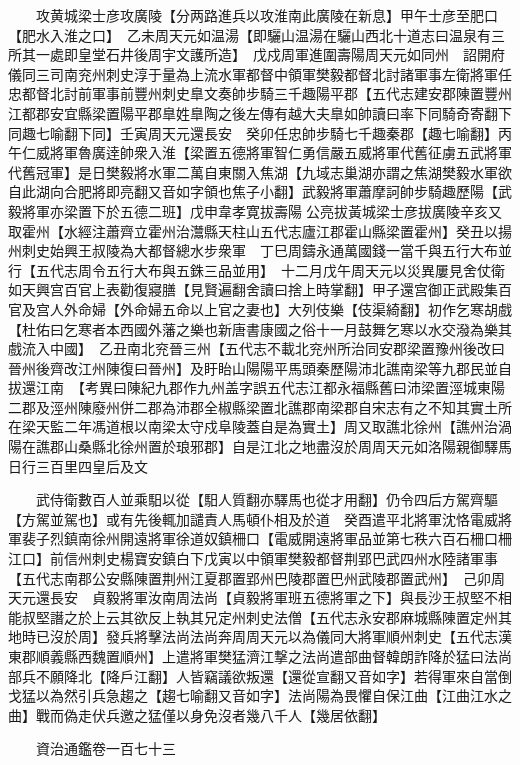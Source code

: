 　　攻黄城梁士彦攻廣陵【分两路進兵以攻淮南此廣陵在新息】甲午士彦至肥口【肥水入淮之口】　乙未周天元如温湯【即驪山温湯在驪山西北十道志曰温泉有三所其一處即皇堂石井後周宇文護所造】　戊戍周軍進圍壽陽周天元如同州　詔開府儀同三司南兖州刺史淳于量為上流水軍都督中領軍樊毅都督北討諸軍事左衛將軍任忠都督北討前軍事前豐州刺史臯文奏帥步騎三千趣陽平郡【五代志建安郡陳置豐州江都郡安宜縣梁置陽平郡臯姓臯陶之後左傳有越大夫臯如帥讀曰率下同騎奇寄翻下同趣七喻翻下同】壬寅周天元還長安　癸卯任忠帥步騎七千趣秦郡【趣七喻翻】丙午仁威將軍魯廣逹帥衆入淮【梁置五德將軍智仁勇信嚴五威將軍代舊征虜五武將軍代舊冠軍】是日樊毅將水軍二萬自東關入焦湖【九域志巢湖亦謂之焦湖樊毅水軍欲自此湖向合肥將即亮翻又音如字領也焦子小翻】武毅將軍蕭摩訶帥步騎趣歷陽【武毅將軍亦梁置下於五德二班】戊申韋孝寛拔壽陽公亮拔黃城梁士彦拔廣陵辛亥又取霍州【水經注蕭齊立霍州治灊縣天柱山五代志廬江郡霍山縣梁置霍州】癸丑以揚州刺史始興王叔陵為大都督總水步衆軍　丁巳周鑄永通萬國錢一當千與五行大布並行【五代志周令五行大布與五銖三品並用】　十二月戊午周天元以災異屢見舍仗衛如天興宫百官上表勸復寢膳【見賢遍翻舍讀曰捨上時掌翻】甲子還宫御正武殿集百官及宫人外命婦【外命婦五命以上官之妻也】大列伎樂【伎渠綺翻】初作乞寒胡戲【杜佑曰乞寒者本西國外藩之樂也新唐書康國之俗十一月鼓舞乞寒以水交潑為樂其戲流入中國】　乙丑南北兖晉三州【五代志不載北兖州所治同安郡梁置豫州後改曰晉州後齊改江州陳復曰晉州】及盱眙山陽陽平馬頭秦歷陽沛北譙南梁等九郡民並自拔還江南　【考異曰陳紀九郡作九州盖字誤五代志江都永福縣舊曰沛梁置涇城東陽二郡及涇州陳廢州併二郡為沛郡全椒縣梁置北譙郡南梁郡自宋志有之不知其實土所在梁天監二年馮道根以南梁太守戍阜陵蓋自是為實土】周又取譙北徐州【譙州治渦陽在譙郡山桑縣北徐州置於琅邪郡】自是江北之地盡沒於周周天元如洛陽親御驛馬日行三百里四皇后及文

　　武侍衛數百人並乘馹以從【馹人質翻亦驛馬也從才用翻】仍令四后方駕齊驅【方駕並駕也】或有先後輒加譴責人馬頓仆相及於道　癸酉遣平北將軍沈恪電威將軍裴子烈鎮南徐州開遠將軍徐道奴鎮柵口【電威開遠將軍品並第七秩六百石柵口柵江口】前信州刺史楊寶安鎮白下戊寅以中領軍樊毅都督荆郢巴武四州水陸諸軍事【五代志南郡公安縣陳置荆州江夏郡置郢州巴陵郡置巴州武陵郡置武州】　己卯周天元還長安　貞毅將軍汝南周法尚【貞毅將軍班五德將軍之下】與長沙王叔堅不相能叔堅譖之於上云其欲反上執其兄定州刺史法僧【五代志永安郡麻城縣陳置定州其地時已沒於周】發兵將擊法尚法尚奔周周天元以為儀同大將軍順州刺史【五代志漢東郡順義縣西魏置順州】上遣將軍樊猛濟江撃之法尚遣部曲督韓朗詐降於猛曰法尚部兵不願降北【降戶江翻】人皆竊議欲叛還【還從宣翻又音如字】若得軍來自當倒戈猛以為然引兵急趨之【趨七喻翻又音如字】法尚陽為畏懼自保江曲【江曲江水之曲】戰而偽走伏兵邀之猛僅以身免沒者幾八千人【幾居依翻】

　　資治通鑑卷一百七十三  
    



